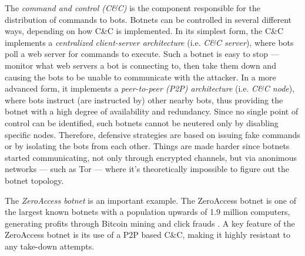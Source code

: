 The \textit{command and control (C\&C)} is the component responsible for the distribution of commands to bots. Botnets can be controlled in several different ways, depending on how C\&C is implemented. In its simplest form, the C\&C implements a \textit{centralized client-server architecture} (i.e. \textit{C\&C server}), where bots poll a web server for commands to execute. Such a botnet is easy to stop — monitor what web servers a bot is connecting to, then take them down and causing the bots to be unable to communicate with the attacker. In a more advanced form, it implements a \textit{peer-to-peer (P2P) architecture} (i.e. \textit{C\&C node}), where bots instruct (are instructed by) other nearby bots, thus providing the botnet with a high degree of availability and redundancy. Since no single point of control can be identified, such botnets cannot be neutered only by disabling specific nodes. Therefore, defensive strategies are based on issuing fake commands or by isolating the bots from each other. Things are made harder since botnets started communicating, not only through encrypted channels, but via anonimous networks — such as Tor — where it’s theoretically impossible to figure out the botnet topology.

The \textit{ZeroAccess botnet} is an important example. The ZeroAccess botnet is one of the largest known botnets with a population upwards of 1.9 million computers, generating profits through Bitcoin mining and click frauds \cite{zeroaccess-symantec-blog,zeroaccess-symantec-definition}.
A key feature of the ZeroAccess botnet is its use of a P2P based C\&C, making it highly resistant to any take-down attempts.
